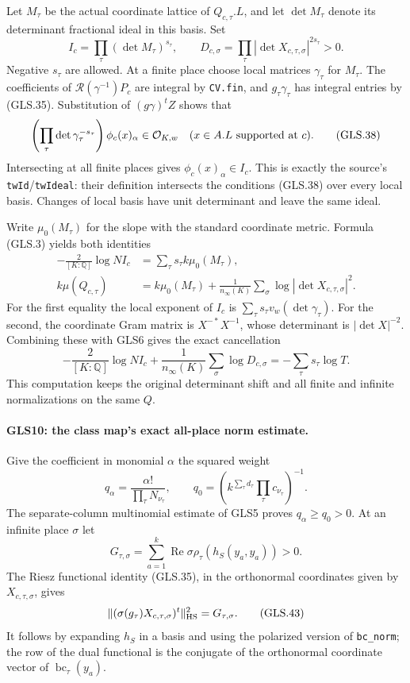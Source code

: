 Let $M_\tau$ be the actual coordinate lattice of $Q_{c,\tau}.L$,
and let $\det M_\tau$ denote its determinant fractional ideal in
this basis.  Set
\[
 I_c=\prod_\tau(\det M_\tau)^{s_\tau},\qquad
 D_{c,\sigma}=\prod_\tau|\det X_{c,\tau,\sigma}|^{2s_\tau}>0.
 \tag{GLS.37}
\]
Negative $s_\tau$ are allowed.  At a finite place choose local
matrices $\gamma_\tau$ for $M_\tau$.  The coefficients of
$\mathcal R(\gamma^{-1})P_c$ are integral by
\texttt{CV.fin}, and $g_\tau\gamma_\tau$ has integral entries
by (GLS.35).  Substitution of $(g\gamma)^tZ$ shows that
\[
 \left(\prod_\tau\det\gamma_\tau^{-s_\tau}\right)
                   \phi_c(x)_\alpha\in\mathcal O_{K,w}
                \quad(x\in A.L\hbox{ supported at }c).
 \tag{GLS.38}
\]
Intersecting at all finite places gives
$\phi_c(x)_\alpha\in I_c$.  This is exactly the source's
\texttt{twId}/\texttt{twIdeal}: their definition intersects the
conditions (GLS.38) over every local basis.  Changes of local basis
have unit determinant and leave the same ideal.

Write $\mu_0(M_\tau)$ for the slope with the standard coordinate
metric.  Formula (GLS.3) yields both identities
\[
 \begin{split}
 -\frac{2}{[K:\mathbb Q]}\log N I_c
       &=\sum_\tau s_\tau k\mu_0(M_\tau),\\
 k\mu(Q_{c,\tau})
       &=k\mu_0(M_\tau)+\frac1{n_\infty(K)}
                            \sum_\sigma\log|\det X_{c,\tau,\sigma}|^2.
 \end{split}                                                   \tag{GLS.39}
\]
For the first equality the local exponent of $I_c$ is
$\sum_\tau s_\tau v_w(\det\gamma_\tau)$.
For the second, the coordinate Gram matrix is $X^{-*}X^{-1}$,
whose determinant is $|\det X|^{-2}$.
Combining these with GLS6 gives the exact cancellation
\[
 -\frac{2}{[K:\mathbb Q]}\log N I_c
 +\frac1{n_\infty(K)}\sum_\sigma\log D_{c,\sigma}
                       =-\sum_\tau s_\tau\log T.
 \tag{GLS.40}
\]
This computation keeps the original determinant shift and all
finite and infinite normalizations on the same $Q$.

\paragraph{GLS10: the class map's exact all-place norm estimate.}
\label{claim:GLS10}
Give the coefficient in monomial $\alpha$ the squared weight
\[
 q_\alpha=\frac{\alpha!}{\prod_\tau N_{\nu_\tau}},
 \qquad q_0=\left(k^{\sum_\tau d_\tau}
                                \prod_\tau c_{\nu_\tau}\right)^{-1}.
 \tag{GLS.41}
\]
The separate-column multinomial estimate of GLS5 proves
$q_\alpha\ge q_0>0$.  At an infinite place $\sigma$ let
\[
 G_{\tau,\sigma}=\sum_{a=1}^k
       \operatorname{Re}\sigma\rho_\tau(h_S(y_a,y_a))>0.
 \tag{GLS.42}
\]
The Riesz functional identity (GLS.35), in the orthonormal coordinates
given by $X_{c,\tau,\sigma}$, gives
\[
 \| (\sigma(g_\tau)X_{c,\tau,\sigma})^t\|_{\rm HS}^2
                                                   =G_{\tau,\sigma}.
 \tag{GLS.43}
\]
It follows by expanding $h_S$ in a basis and using the polarized
version of \texttt{bc\_norm}; the row of the dual functional is
the conjugate of the orthonormal coordinate vector of
$\operatorname{bc}_\tau(y_a)$.

